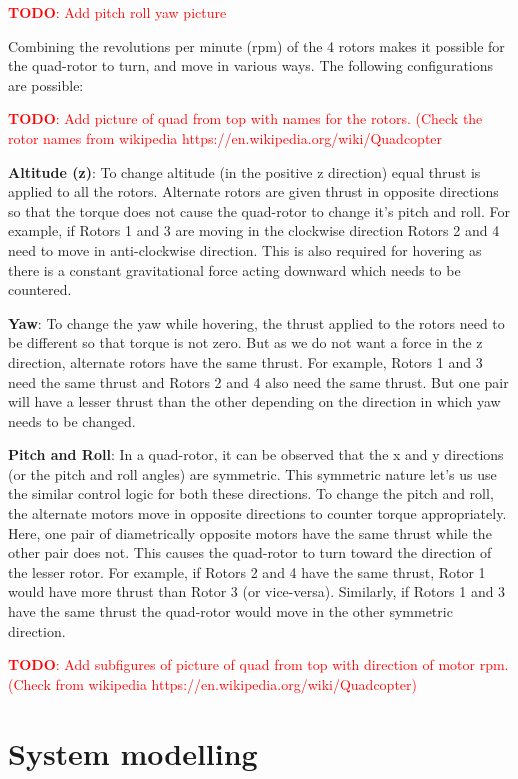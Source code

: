 \documentclass[BTech]{iitmdiss}
\newcommand\todo[1]{\textcolor{red}{{\bf TODO}: #1}}
\begin{document}
\todo{Add pitch roll yaw picture}

Combining the revolutions per minute (rpm) of the 4 rotors makes it possible for the quad-rotor to turn, and move in various ways. The following configurations are possible:

\todo{Add picture of quad from top with names for the rotors. (Check the rotor names from wikipedia https://en.wikipedia.org/wiki/Quadcopter}

{\bf Altitude (z)}: To change altitude (in the positive z direction) equal thrust is applied to all the rotors. Alternate rotors are given thrust in opposite directions so that the torque does not cause the quad-rotor to change it's pitch and roll. For example, if Rotors 1 and 3 are moving in the clockwise direction Rotors 2 and 4 need to move in anti-clockwise direction. This is also required for hovering as there is a constant gravitational force acting downward which needs to be countered.

{\bf Yaw}: To change the yaw while hovering, the thrust applied to the rotors need to be different so that torque is not zero. But as we do not want a force in the z direction, alternate rotors have the same thrust. For example, Rotors 1 and 3 need the same thrust and Rotors 2 and 4 also need the same thrust. But one pair will have a lesser thrust than the other depending on the direction in which yaw needs to be changed.

{\bf Pitch and Roll}: In a quad-rotor, it can be observed that the x and y directions (or the pitch and roll angles) are symmetric. This symmetric nature let's us use the similar control logic for both these directions. To change the pitch and roll, the alternate motors move in opposite directions to counter torque appropriately. Here, one pair of diametrically opposite motors have the same thrust while the other pair does not. This causes the quad-rotor to turn toward the direction of the lesser rotor. For example, if Rotors 2 and 4 have the same thrust, Rotor 1 would have more thrust than Rotor 3 (or vice-versa). Similarly, if Rotors 1 and 3 have the same thrust the quad-rotor would move in the other symmetric direction.

\todo{Add subfigures of picture of quad from top with direction of motor rpm. (Check from wikipedia https://en.wikipedia.org/wiki/Quadcopter)}

\section{System modelling}
\end{document}
